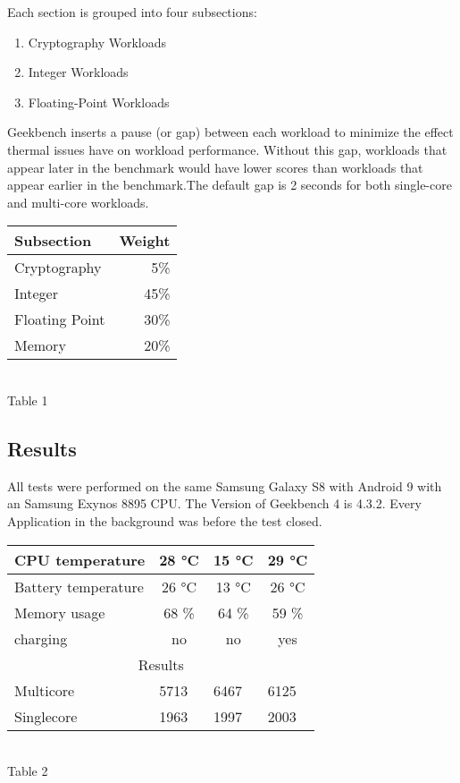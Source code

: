 \documentclass[conference, 11pt]{IEEEtran}
\begin{document}
Each section is grouped into four subsections:
\begin{enumerate}
\item Cryptography Workloads
\item Integer Workloads
\item Floating-Point Workloads
\end{enumerate}
Geekbench inserts a pause (or gap) between each workload to minimize the effect thermal issues have on workload performance. Without this gap, workloads that appear later in the benchmark would have lower scores than workloads that appear earlier in the benchmark.The default gap is 2 seconds for both single-core and multi-core workloads. 
\begin{table}[htbp]
\centering
\begin{tabular}{|l|r|} 
\hline
Subsection     & Weight  \\ 
\hline
Cryptography   & 5\%     \\ 
\hline
Integer        & 45\%    \\ 
\hline
Floating Point & 30\%    \\ 
\hline
Memory         & 20\%    \\
\hline
\end{tabular}
\\
\vspace{5mm}
Table 1
\end{table}
\cite{geek}
\subsection{Results}
All tests were performed on the same Samsung Galaxy S8 with Android 9 with an Samsung Exynos 8895 CPU. The Version of Geekbench 4 is 4.3.2.
Every Application in the background was before the test closed.
\begin{table}[htbp]
\centering
\begin{tabular}{|l|c|c|c|}
\hline
CPU temperature     & 28 °C                     & 15 °C                     & 29 °C                     \\ \hline
Battery temperature & 26 °C                     & 13 °C                     & 26 °C                     \\ \hline
Memory usage        & 68 \%                     & 64 \%                     & 59 \%                     \\ \hline
charging            & no                        & no                        & yes                       \\ \hline
\multicolumn{4}{|c|}{Results}                                                                           \\ \hline
Multicore           & \multicolumn{1}{l|}{5713} & \multicolumn{1}{l|}{6467} & \multicolumn{1}{l|}{6125} \\ \hline
Singlecore          & \multicolumn{1}{l|}{1963} & \multicolumn{1}{l|}{1997} & \multicolumn{1}{l|}{2003} \\ \hline
\end{tabular}
\\
\vspace{5mm}
Table 2
\end{table}
\end{document}
